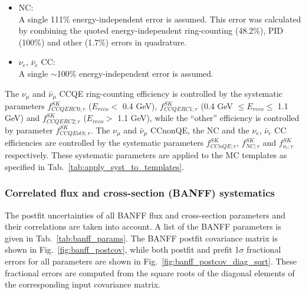 \begin{enumerate}
\begin{itemize}
        This error was calculated by combining the quoted energy-independent 
        ring-counting (19.9\%) and other (1.7\%) errors in quadrature.
  \item NC:\\
        A single 111\% energy-independent error is assumed.
        This error was calculated by combining the quoted energy-independent 
        ring-counting (48.2\%), PID (100\%) and other (1.7\%) errors in quadrature. 
  \item $\nu_{e}$, $\bar{\nu}_{e}$ CC:\\
        A single $\sim$100\% energy-independent error is assumed.
  \end{itemize}

   The $\nu_\mu$ and $\bar{\nu}_{\mu}$ CCQE ring-counting efficiency is controlled by the systematic parameters
   $f_{CCQERC0; r}^{SK}$ ($E_{reco} <$ 0.4 GeV),
   $f_{CCQERC1; r}^{SK}$ (0.4 GeV $\leq E_{reco} \leq$ 1.1 GeV) and
   $f_{CCQERC2; r}^{SK}$ ($E_{reco} >$ 1.1 GeV), 
   while the ``other'' efficiency is controlled by parameter $f_{CCQEoth; r}^{SK}$.
   The $\nu_\mu$ and $\bar{\nu}_{\mu}$ CCnonQE, the NC and the $\nu_{e}$, $\bar{\nu}_{e}$ CC efficiencies
   are controlled by the systematic parameters
   $f_{CCnQE; r}^{SK}$, $f_{NC; r}^{SK}$ and $f_{\nu_e; r}^{SK}$ respectively.
   These systematic parameters are applied to the MC templates as specified in Tab.\ \ref{tab:apply_syst_to_templates}.
  
\end{enumerate}

\clearpage

\subsubsection {Correlated flux and cross-section (BANFF) systematics}
\label{sec:systematics:inputs:banff}

The postfit uncertainties of all BANFF flux and cross-section parameters 
and their correlations are taken into account.
A list of the BANFF parameters is given in Tab.\ \ref{tab:banff_params}. 
The BANFF postfit covariance matrix is shown in Fig.\ \ref{fig:banff_postcov},
while both postfit and prefit 1$\sigma$ fractional errors for all parameters
are shown in Fig.\ \ref{fig:banff_postcov_diag_sqrt}. These fractional errors are 
computed from the square roots of the diagonal elements of the corresponding input covariance matrix.

